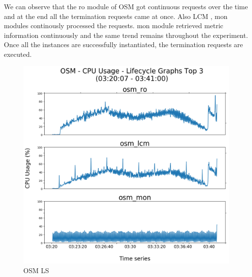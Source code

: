 We can observe that the ro module of OSM got continuous requests over the time and at the end all the termination requests came at once. Also LCM , mon modules continously processed the requests. mon module retrieved metric information continuously and the same trend
remains throughout the experiment. Once all the instances are successfully instantiated, the termination requests are executed. 

\begin{figure}[h]
	\centering
	\includegraphics[width=1\linewidth]{figures/scalability_graphs/Lifecycle-Graphs-Top-3/OSM-TOP-3-Lifecycle}
	\caption{OSM LS}
	\label{fig:osm-top-3-lifecycle}
\end{figure}
